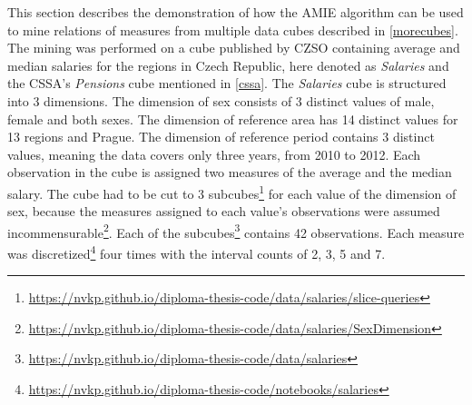 This section describes the demonstration of how the AMIE algorithm can be used to mine relations of measures from multiple data cubes described in \ref{morecubes}. The mining was performed on a cube published by CZSO containing average and median salaries for the regions in Czech Republic, here denoted as \textit{Salaries} and the CSSA's \textit{Pensions} cube mentioned in \ref{cssa}. The \textit{Salaries} cube is structured into 3 dimensions. The dimension of sex consists of 3 distinct values of male, female and both sexes. The dimension of reference area has 14 distinct values for 13 regions and Prague. The dimension of reference period contains 3 distinct values, meaning the data covers only three years, from 2010 to 2012. Each observation in the cube is assigned two measures of the average and the median salary. The cube had to be cut to 3 subcubes\footnote{\href{https://nvkp.github.io/diploma-thesis-code/data/salaries/slice-queries}{https://nvkp.github.io/diploma-thesis-code/data/salaries/slice-queries}} for each value of the dimension of sex, because the measures assigned to each value's observations were assumed incommensurable\footnote{\href{https://nvkp.github.io/diploma-thesis-code/data/salaries/SexDimension}{https://nvkp.github.io/diploma-thesis-code/data/salaries/SexDimension}}. Each of the subcubes\footnote{\href{https://nvkp.github.io/diploma-thesis-code/data/salaries}{https://nvkp.github.io/diploma-thesis-code/data/salaries}} contains 42 observations. Each measure was discretized\footnote{\href{https://nvkp.github.io/diploma-thesis-code/notebooks/salaries}{https://nvkp.github.io/diploma-thesis-code/notebooks/salaries}} four times with the interval counts of 2, 3, 5 and 7.

